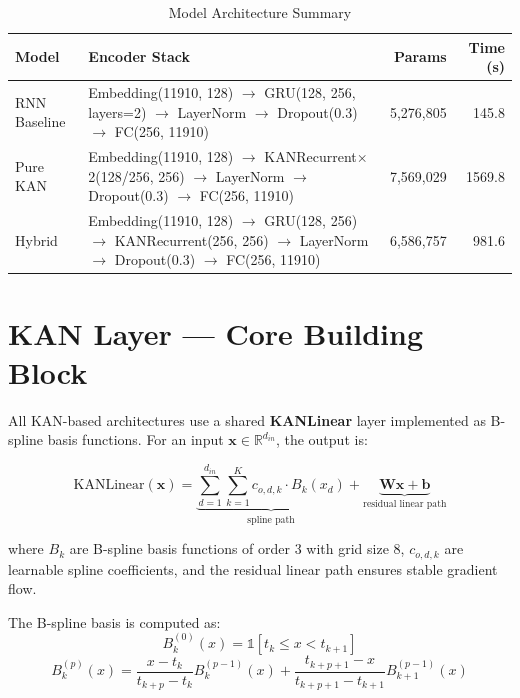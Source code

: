 \documentclass[12pt,a4paper]{report}
\begin{document}
\begin{table}[H]
\centering
\caption{Model Architecture Summary}
\begin{tabular}{p{2.2cm} p{7.5cm} r r}
\toprule
\textbf{Model} & \textbf{Encoder Stack} & \textbf{Params} & \textbf{Time (s)} \\
\midrule
RNN Baseline
  & Embedding(11910, 128) $\to$ GRU(128, 256, layers=2)
    $\to$ LayerNorm $\to$ Dropout(0.3) $\to$ FC(256, 11910)
  & 5,276,805 & 145.8 \\[4pt]
Pure KAN
  & Embedding(11910, 128) $\to$ KANRecurrent$\times$2(128/256, 256)
    $\to$ LayerNorm $\to$ Dropout(0.3) $\to$ FC(256, 11910)
  & 7,569,029 & 1569.8 \\[4pt]
Hybrid
  & Embedding(11910, 128) $\to$ GRU(128, 256)
    $\to$ KANRecurrent(256, 256)
    $\to$ LayerNorm $\to$ Dropout(0.3) $\to$ FC(256, 11910)
  & 6,586,757 & 981.6 \\
\bottomrule
\end{tabular}
\label{tab:arch_overview}
\end{table}

\section{KAN Layer --- Core Building Block}

All KAN-based architectures use a shared \textbf{KANLinear} layer implemented as
B-spline basis functions. For an input $\mathbf{x} \in \mathbb{R}^{d_{in}}$, the
output is:

\begin{equation}
\text{KANLinear}(\mathbf{x}) =
  \underbrace{\sum_{d=1}^{d_{in}} \sum_{k=1}^{K} c_{o,d,k} \cdot B_k(x_d)}_{\text{spline path}}
  + \underbrace{\mathbf{W}\mathbf{x} + \mathbf{b}}_{\text{residual linear path}}
\end{equation}

where $B_k$ are B-spline basis functions of order 3 with grid size 8,
$c_{o,d,k}$ are learnable spline coefficients, and the residual linear path
ensures stable gradient flow.

The B-spline basis is computed as:
\begin{equation}
B_k^{(0)}(x) = \mathbb{1}[t_k \leq x < t_{k+1}]
\end{equation}
\begin{equation}
B_k^{(p)}(x) = \frac{x - t_k}{t_{k+p} - t_k} B_k^{(p-1)}(x)
             + \frac{t_{k+p+1} - x}{t_{k+p+1} - t_{k+1}} B_{k+1}^{(p-1)}(x)
\end{equation}
\end{document}
